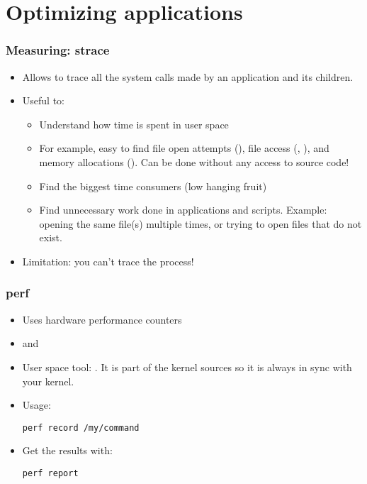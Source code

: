 \section{Optimizing applications}

\begin{frame}
\frametitle{Measuring: strace}
\begin{itemize}
	\item Allows to trace all the system calls made by an
              application and its children.
	\item Useful to:
	\begin{itemize}
		\item Understand how time is spent in user space
		\item For example, easy to find file open attempts (),
		      file access (, ), and
		      memory allocations (). Can be done
		      without any access to source code!
		\item Find the biggest time consumers
		      (low hanging fruit)
		\item Find unnecessary work done in applications
		      and scripts. Example: opening the same file(s)
		      multiple times, or trying to open files that
		      do not exist.
	\end{itemize}
	\item Limitation: you can't trace the  process!
\end{itemize}
\end{frame}





\begin{frame}[fragile]
\frametitle{perf}
\begin{itemize}
	\item Uses hardware performance counters
	\item {} and 
	\item User space tool: . It is part of the kernel
		sources so it is always in sync with your kernel.
	\item Usage:
	\begin{block}{}
\begin{verbatim}
perf record /my/command
\end{verbatim}
	\end{block}
	\item Get the results with:
	\begin{block}{}
\begin{verbatim}
perf report
\end{verbatim}
	\end{block}
\end{itemize}
\end{frame}

